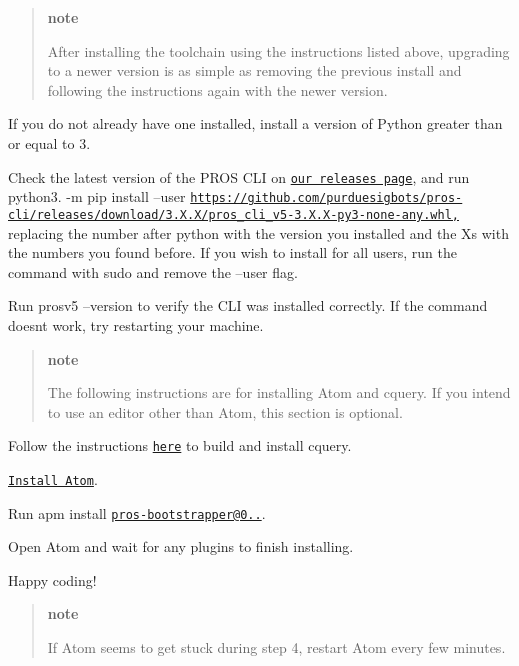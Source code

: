 \begin{quote}
{\bfseries note}

After installing the toolchain using the instructions listed above, upgrading to a newer version is as simple as removing the previous install and following the instructions again with the newer version. \end{quote}



\begin{DoxyEnumerate}
\item If you do not already have one installed, install a version of Python greater than or equal to 3.
\item Check the latest version of the P\+R\+OS C\+LI on \href{https://github.com/purduesigbots/pros-cli3/releases/latest}{\tt our releases page}, and run python3. -\/m pip install --user \href{https://github.com/purduesigbots/pros-cli/releases/download/3.X.X/pros_cli_v5-3.X.X-py3-none-any.whl,}{\tt https\+://github.\+com/purduesigbots/pros-\/cli/releases/download/3.\+X.\+X/pros\+\_\+cli\+\_\+v5-\/3.\+X.\+X-\/py3-\/none-\/any.\+whl,} replacing the number after \textquotesingle{}python\textquotesingle{} with the version you installed and the Xs with the numbers you found before. If you wish to install for all users, run the command with sudo and remove the --user flag.
\item Run prosv5 --version to verify the C\+LI was installed correctly. If the command doesn\textquotesingle{}t work, try restarting your machine.
\end{DoxyEnumerate}

\begin{quote}
{\bfseries note}

The following instructions are for installing Atom and cquery. If you intend to use an editor other than Atom, this section is optional. \end{quote}



\begin{DoxyEnumerate}
\item Follow the instructions \href{https://github.com/cquery-project/cquery/wiki/Building-cquery}{\tt here} to build and install cquery.
\item \href{https://atom.io}{\tt Install Atom}.
\item Run apm install \href{mailto:pros-bootstrapper@0.0.12}{\tt pros-\/bootstrapper@0..}.
\item Open Atom and wait for any plugins to finish installing.
\item Happy coding!
\end{DoxyEnumerate}

\begin{quote}
{\bfseries note}

If Atom seems to get stuck during step 4, restart Atom every few minutes.\end{quote}
